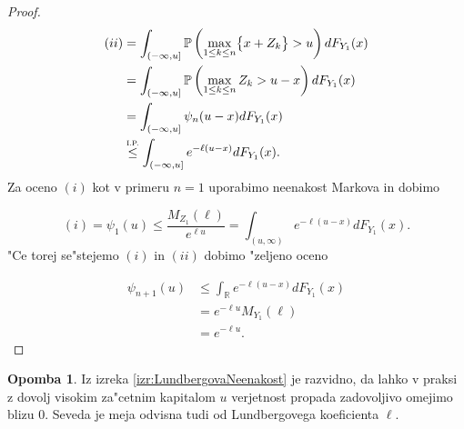 \documentclass[12pt, a4paper, reqno]{amsart}
\theoremstyle{definition}
\newtheorem{opomba}[definicija]{Opomba}
\theoremstyle{plain}
\newcommand{\R}{\mathbb{R}}
\newcommand{\Prob}{\mathbb{P}}
\newcommand{\1}{\mathds{1}}
\begin{document}
\begin{proof}
\begin{align*}
                    (ii) &= \int_{(-\infty, u]}\Prob\left(\max_{1\leq k\leq n}\bigl\{x + Z_k\bigr\} > u\right)dF_{Y_1}(x) \\
                         &= \int_{(-\infty, u]}\Prob\left(\max_{1\leq k\leq n}Z_k > u - x\right)dF_{Y_1}(x) \\
                         &= \int_{(-\infty, u]}\psi_n(u - x)dF_{Y_1}(x) \\
                         &\stackrel{\text{\scalebox{0.8}{I.P.}}}{\leq} \int_{(-\infty, u]}e^{-\ell(u - x)}dF_{Y_1}(x). \\
                \end{align*}
                Za oceno $(i)$ kot v primeru $n=1$ uporabimo neenakost Markova in dobimo

                \begin{equation*}
                    (i) = \psi_1(u) \leq \frac{M_{Z_1}(\ell)}{e^{\ell u}} = \int_{(u, \infty)}e^{-\ell (u-x)}dF_{Y_1}(x).
                \end{equation*}
                "Ce torej se"stejemo $(i)$ in $(ii)$ dobimo "zeljeno oceno

                \begin{align*}
                    \psi_{n+1}(u) &\leq \int_{\R}e^{-\ell (u - x)}dF_{Y_1}(x) \\
                                  &= e^{-\ell u}M_{Y_1}(\ell) \\
                                  &= e^{-\ell u}.
                \end{align*}

            \end{proof}

            \begin{opomba}
                Iz izreka \ref{izr:LundbergovaNeenakost} je razvidno, da lahko v praksi z
                 dovolj visokim za"cetnim kapitalom
                $u$ verjetnost propada zadovoljivo omejimo blizu $0$. Seveda je meja 
                odvisna tudi od Lundbergovega koeficienta $\ell$.
                \label{op:LundbergovaNeenakost}
            \end{opomba}
\end{document}
